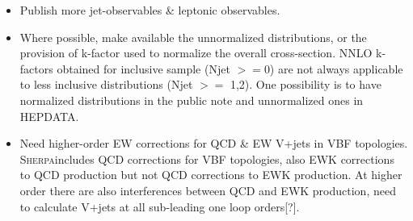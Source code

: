 \documentclass[a4paper,11pt,notoc]{article}
\newcommand{\SHERPA}{\textsc{Sherpa}}
\begin{document}
\begin{itemize}
\item Publish more jet-observables \& leptonic observables.
\item Where possible, make available the unnormalized distributions, or the provision of k-factor used to normalize the overall cross-section. NNLO k-factors obtained for inclusive sample (Njet $>=$0) are not always applicable to less inclusive distributions (Njet $>=$ 1,2). One possibility is to have normalized distributions in the public note and unnormalized ones in HEPDATA.
\item Need higher-order EW corrections for QCD \& EW V+jets in VBF topologies. \SHERPA includes QCD corrections for VBF topologies, also EWK corrections to QCD production but not QCD corrections to EWK production. At higher order there are also interferences between QCD and EWK production, need to calculate V+jets at all sub-leading one loop orders[?].  
\end{itemize}



\end{document}

